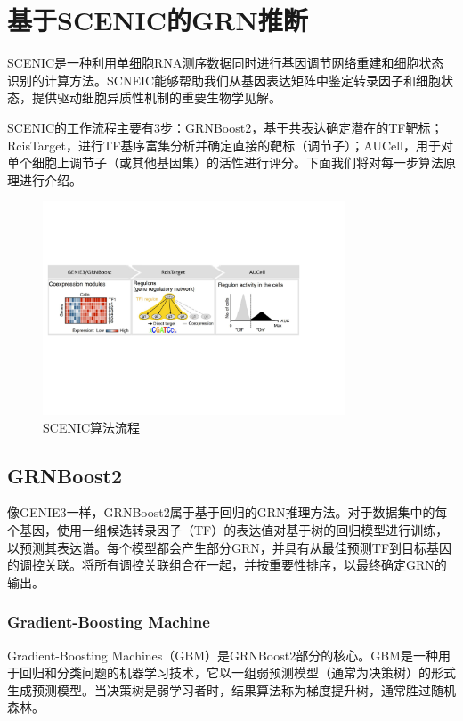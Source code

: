 
\chapter{基于SCENIC的GRN推断}
  SCENIC是一种利用单细胞RNA测序数据同时进行基因调节网络重建和细胞状态识别的计算方法。SCNEIC能够帮助我们从基因表达矩阵中鉴定转录因子和细胞状态，提供驱动细胞异质性机制的重要生物学见解。

  SCENIC的工作流程主要有3步：GRNBoost2，基于共表达确定潜在的TF靶标；RcisTarget，进行TF基序富集分析并确定直接的靶标（调节子）；AUCell，用于对单个细胞上调节子（或其他基因集）的活性进行评分。下面我们将对每一步算法原理进行介绍。

\begin{figure}[!htb]
  \centering
  \includegraphics[width=0.8\textwidth]{figs/scenic-workflow.pdf}
  \caption{SCENIC算法流程}
  \label{fig:scenic-workflow}
\end{figure}

\section{GRNBoost2}
  像GENIE3\cite{huynh2010inferring}一样，GRNBoost2属于基于回归的GRN推理方法\cite{sanguinetti2019gene}。对于数据集中的每个基因，使用一组候选转录因子（TF）的表达值对基于树的回归模型进行训练，以预测其表达谱。每个模型都会产生部分GRN，并具有从最佳预测TF到目标基因的调控关联。将所有调控关联组合在一起，并按重要性排序，以最终确定GRN的输出。

\subsection{Gradient-Boosting Machine}
  Gradient-Boosting Machines（GBM）\cite{friedman2001greedy}是GRNBoost2\cite{moerman2019grnboost2}部分的核心。GBM是一种用于回归和分类问题的机器学习技术，它以一组弱预测模型（通常为决策树）的形式生成预测模型。当决策树是弱学习者时，结果算法称为梯度提升树，通常胜过随机森林。

